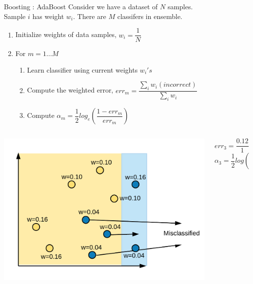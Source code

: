 \documentclass{beamer}
\begin{document}
\begin{frame}{Boosting : AdaBoost }
  Consider we have a dataset of $N$ samples.\\
  Sample $i$ has weight $w_i$. There are $M$ classifers in ensemble.\\
  \begin{enumerate}
    \item Initialize weights of data samples, $w_i = \dfrac{1}{N}$
    \item For $m = 1\dots M$
          \begin{enumerate}
            \item Learn classifier using current weights $w_i's$
            \item Compute the weighted error, $err_m = \dfrac{\sum\limits_iw_i(incorrect)}{\sum\limits_iw_i}$
            \item Compute $\alpha_m = \dfrac{1}{2}log_e\left(\dfrac{1 - err_m}{err_m}\right)$
          \end{enumerate}
  \end{enumerate}
  \begin{columns}
    \begin{column}{0.5\textwidth}
      \centering
      \includegraphics[width = \textwidth]{ada_iter3_misclassify}
    \end{column}
    \begin{column}{0.5\textwidth}
      $err_3 = \dfrac{0.12}{1}$\\
      $\alpha_3 = \dfrac{1}{2}log\left(\dfrac{1-0.12}{0.12}\right) = 0.99$
    \end{column}
  \end{columns}
\end{frame}
\end{document}
